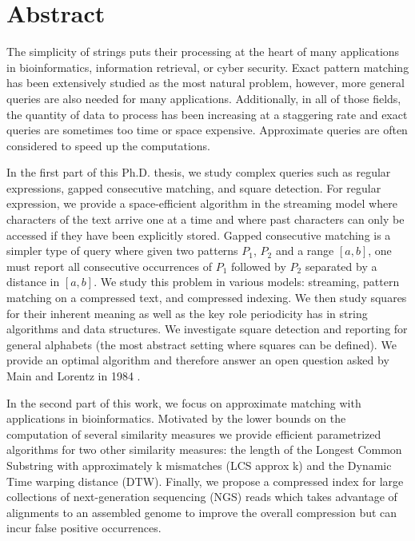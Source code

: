 \chapter*{Abstract}

The simplicity of strings puts their processing at the heart of many applications in bioinformatics, information retrieval, or cyber security. Exact pattern matching has been extensively studied \cite{} as the most natural problem, however, more general queries are also needed for many applications\cite{}. Additionally, in all of those fields, the quantity of data to process has been increasing at a staggering rate\cite{} and exact queries are sometimes too time or space expensive. Approximate queries are often considered to speed up the computations.

In the first part of this Ph.D. thesis, we study complex queries such as regular expressions, gapped consecutive matching, and square detection. 
For regular expression, we provide a space-efficient algorithm in the streaming model where characters of the text arrive one at a time and where past characters can only be accessed if they have been explicitly stored. 
Gapped consecutive matching is a simpler type of query where given two patterns $P_1$, $P_2$ and a range $[a,b]$, one must report all consecutive occurrences of $P_1$ followed by $P_2$ separated by a distance in $[a,b]$. We study this problem in various models: streaming, pattern matching on a compressed text, and compressed indexing.
We then study squares for their inherent meaning \cite{} as well as the key role periodicity has in string algorithms and data structures. We investigate square detection and reporting for general alphabets (the most abstract setting where squares can be defined). We provide an optimal algorithm and therefore answer an open question asked by Main and Lorentz in 1984 \cite{}.

In the second part of this work, we focus on approximate matching with applications in bioinformatics.
Motivated by the lower bounds on the computation of several similarity measures we provide efficient parametrized algorithms for two other similarity measures: the length of the Longest Common Substring with approximately k mismatches (LCS approx k) and the Dynamic Time warping distance (DTW).
Finally, we propose a compressed index for large collections of next-generation sequencing (NGS) reads which takes advantage of alignments to an assembled genome to improve the overall compression but can incur false positive occurrences.


